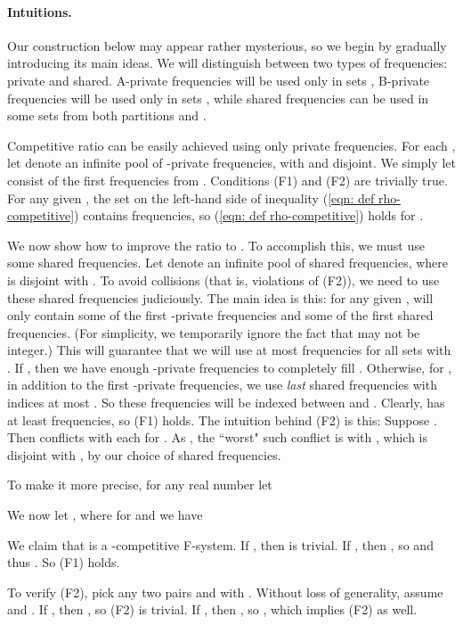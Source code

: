 \documentclass[11pt]{article}
\begin{document}
\paragraph{Intuitions.}
Our construction below may appear rather mysterious, so we begin by
gradually introducing its main ideas.
We will distinguish between two types of frequencies: private and
shared. A-private frequencies will be used only in sets ,
B-private frequencies will be used only in sets ,
while shared frequencies can be used in some sets from both partitions
 and .

Competitive ratio  can be easily achieved using only private frequencies. For
each ,
let  denote an infinite pool of -private frequencies, 
with  and  disjoint. We
simply let  consist of the first  frequencies from .
Conditions (F1) and (F2) are trivially true.
For any given , the set on the left-hand side of 
inequality (\ref{eqn: def rho-competitive}) contains  frequencies,
so (\ref{eqn: def rho-competitive}) holds for .

We now show how to improve the ratio to . To accomplish this,
we must use some shared frequencies.
Let  denote an infinite pool of shared frequencies, where  is
disjoint with .
To avoid collisions (that is, violations of (F2)), we need
to use these shared frequencies judiciously. The main idea is this: for
any given ,  will only contain some of the first
 -private frequencies and some of the first  shared
frequencies. (For simplicity, we temporarily
ignore the fact that  may not be integer.) 
This will guarantee that we will use at most 
frequencies for all sets  with .
If , then we have enough -private frequencies to completely fill
. Otherwise, for ,
in addition to the first  -private frequencies,
 we use  \emph{last} shared
frequencies with indices at most . So these frequencies will be
indexed between  and . Clearly,
 has at least  frequencies, so (F1) holds.
The intuition behind (F2) is this: Suppose . Then
 conflicts with each  for .
As , the ``worst" such conflict is with , which 
is disjoint with , by our choice of shared frequencies.

To make it more precise, for any real number  let

We now let , where for  and  we
have

We claim that  is a -competitive F-system.
If , then  is trivial.
If , then ,
so  and thus
. So (F1) holds. 

To verify (F2),
pick any two pairs  and  with . 
Without loss of generality, assume  and . 
If , then , so
(F2) is trivial. If , then , so
,
which implies (F2) as well.
\end{document}
